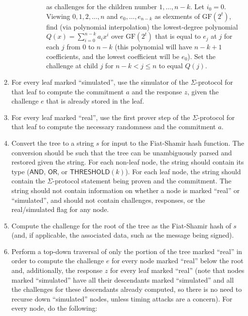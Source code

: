 \documentclass[11pt]{article}
\newcommand{\andnode}{\ensuremath{\mathsf{AND}}}
\newcommand{\ornode}{\ensuremath{\mathsf{OR}}}
\newcommand{\tnode}{\ensuremath{\mathsf{THRESHOLD}}}
\newcommand{\GF}{\ensuremath{\mathrm{GF}}}
\begin{document}
\begin{enumerate}
\begin{itemize}
\begin{itemize}
\begin{enumerate}
	         as challenges for the children number $1, \dots, n-k$.
	         Let $i_0 = 0$. Viewing $0, 1, 2, \dots, n$ and $e_0, \dots, e_{n-k}$ as elexments of $\GF(2^t)$, find (via polynomial interpolation) the
	          lowest-degree polynomial $Q(x)=\sum_{i=0}^{n-k} a_i x^i $ over $\GF(2^t)$ that is equal to $e_j$ at $j$ for each $j$ from
	          $0$ to $n-k$ (this polynomial will have $n-k+1$ coefficients, and the lowest coefficient will be $e_0$). Set the challenge at child
	          $j$ for $n-k<j\le n$ to equal $Q(j)$.
 	   \end{enumerate} 
        \end{itemize}
    \end{itemize}
    
    \item For every leaf marked ``simulated'', use the simulator of the $\Sigma$-protocol for that leaf to compute the commitment $a$ and the response $z$, given the challenge $e$ that is already stored in the leaf.
    
    \item For every leaf marked ``real'', use the first prover step of the $\Sigma$-protocol for that leaf to compute the necessary randomness and the commitment $a$.
    
    \item \label{step:fs}  Convert the tree to a string $s$ for input to the Fiat-Shamir hash function. The conversion should be such that the tree can be unambiguously parsed and restored given the string. For each non-leaf node, the string should contain its type ($\andnode$, $\ornode$, or $\tnode(k)$). For each leaf node, the string should contain the $\Sigma$-protocol statement being proven and the commitment. The string should not contain information on whether a node is marked ``real'' or ``simulated'', and should not contain challenges, responses, or the real/simulated flag for any node.
    
    \item Compute the challenge for the root of the tree as the Fiat-Shamir hash of $s$ (and, if applicable,  the associated data, such as the message being signed). 
    
    \item Perform a top-down traversal of only the portion of the tree marked ``real'' in order to compute the challenge $e$ for every node marked ``real'' below the root and, additionally, the response $z$ for every leaf marked ``real'' (note that nodes marked ``simulated'' have all their descendants marked ``simulated'' and all the challenges for these descendants already computed, so there is no need to recurse down ``simulated'' nodes, unless timing attacks are a concern). For every node, do the following:
    

\end{enumerate}
\end{document}
